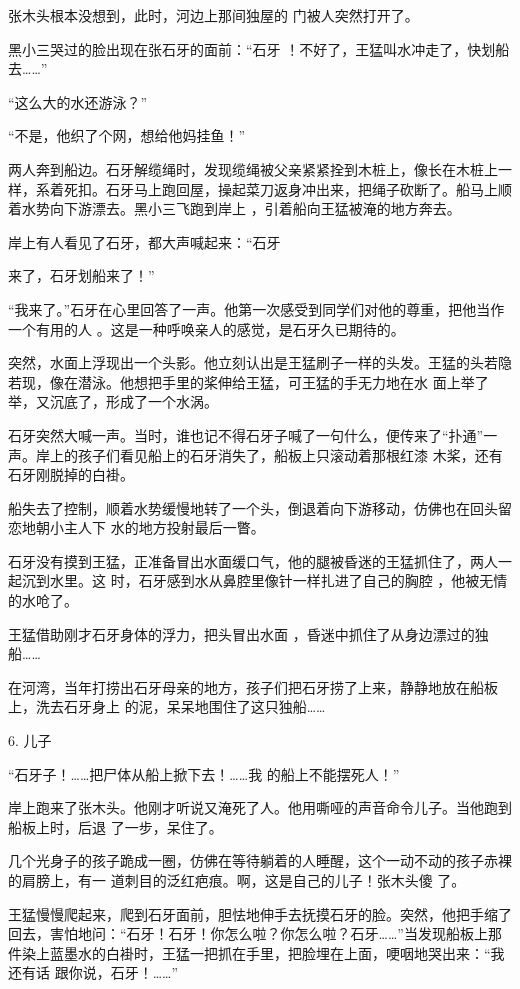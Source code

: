 \documentclass{article}
\begin{document}
张木头根本没想到，此时，河边上那间独屋的
门被人突然打开了。 

黑小三哭过的脸出现在张石牙的面前：“石牙
！不好了，王猛叫水冲走了，快划船去……” 


“这么大的水还游泳？” 


“不是，他织了个网，想给他妈挂鱼！” 

两人奔到船边。石牙解缆绳时，发现缆绳被父亲紧紧拴到木桩上，像长在木桩上一样，系着死扣。石牙马上跑回屋，操起菜刀返身冲出来，把绳子砍断了。船马上顺着水势向下游漂去。黑小三飞跑到岸上
，引着船向王猛被淹的地方奔去。 

岸上有人看见了石牙，都大声喊起来：“石牙

\newpage
来了，石牙划船来了！” 

“我来了。”石牙在心里回答了一声。他第一次感受到同学们对他的尊重，把他当作一个有用的人
。这是一种呼唤亲人的感觉，是石牙久已期待的。 

突然，水面上浮现出一个头影。他立刻认出是王猛刷子一样的头发。王猛的头若隐若现，像在潜泳。他想把手里的桨伸给王猛，可王猛的手无力地在水
面上举了举，又沉底了，形成了一个水涡。 

石牙突然大喊一声。当时，谁也记不得石牙子喊了一句什么，便传来了“扑通”一声。岸上的孩子们看见船上的石牙消失了，船板上只滚动着那根红漆
木桨，还有石牙刚脱掉的白褂。 

船失去了控制，顺着水势缓慢地转了一个头，倒退着向下游移动，仿佛也在回头留恋地朝小主人下
水的地方投射最后一瞥。 

石牙没有摸到王猛，正准备冒出水面缓口气，他的腿被昏迷的王猛抓住了，两人一起沉到水里。这
\newpage
时，石牙感到水从鼻腔里像针一样扎进了自己的胸腔
，他被无情的水呛了。 

王猛借助刚才石牙身体的浮力，把头冒出水面
，昏迷中抓住了从身边漂过的独船…… 

在河湾，当年打捞出石牙母亲的地方，孩子们把石牙捞了上来，静静地放在船板上，洗去石牙身上
的泥，呆呆地围住了这只独船…… 


6. 儿子 

“石牙子！……把尸体从船上掀下去！……我
的船上不能摆死人！” 

岸上跑来了张木头。他刚才听说又淹死了人。他用嘶哑的声音命令儿子。当他跑到船板上时，后退
了一步，呆住了。 

几个光身子的孩子跪成一圈，仿佛在等待躺着的人睡醒，这个一动不动的孩子赤裸的肩膀上，有一
\newpage
道刺目的泛红疤痕。啊，这是自己的儿子！张木头傻
了。 

王猛慢慢爬起来，爬到石牙面前，胆怯地伸手去抚摸石牙的脸。突然，他把手缩了回去，害怕地问：“石牙！石牙！你怎么啦？你怎么啦？石牙……”当发现船板上那件染上蓝墨水的白褂时，王猛一把抓在手里，把脸埋在上面，哽咽地哭出来：“我还有话
跟你说，石牙！……” 
\end{document}

